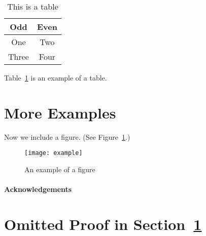 \documentclass[a4paper]{article}
\theoremstyle{plain}
\theoremstyle{definition}
\begin{document}
	\begin{table}[ht]
		\centering
		\begin{tabular}{|c|c|}
			\hline
			\textbf{Odd} & \textbf{Even} \\
			\hline\hline
			One & Two \\
			\hline
			Three & Four \\
			\hline
		\end{tabular}
		\caption{This is a table}
		\label{tbl:1}
	\end{table}

	Table~\ref*{tbl:1} is an example of a table.
	
	\section{More Examples}
	\label{sec:examples}
	
	Now we include a figure.
	(See Figure~\ref{fig:example}.)
	\begin{figure}[ht]
		\centering
		\texttt{[image: example]}
		\caption{An example of a figure}
		\label{fig:example}
	\end{figure}
	
	\paragraph{Acknowledgements} \lipsum[6]
	
	
	
	\appendix
	
	\section{Omitted Proof in Section~\ref{sec:examples}}
	\label{app:1}
	
	\lipsum[7]
	
\end{document}
